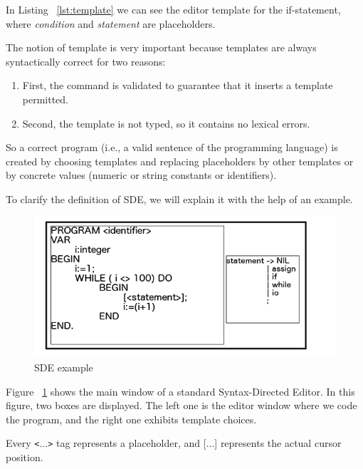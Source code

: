 \documentclass[
  oneside,
  11pt, a4paper,
  footinclude=true,
  headinclude=true,
  cleardoublepage=empty
]{scrbook}
\begin{document}
In Listing ~\ref{lst:template} we can see the editor template for the if-statement, where \textit{condition} and \textit{statement} are placeholders.

The notion of template is very important because templates are always syntactically correct for two reasons:

\begin{enumerate}
  \item First, the command is validated to guarantee that it inserts a template permitted. %

  \item Second, the template is not typed, so it contains no lexical errors.

\end{enumerate}

So a correct program (i.e., a valid sentence of the programming language) is created by choosing templates and replacing placeholders by other templates or by concrete values (numeric or string constants or identifiers).


To clarify the definition of SDE, we will explain it with the help of an example.

\begin{figure}[h!]
  \centering
    \includegraphics[width=1\textwidth]{img/SDE.png}
    \caption{SDE example}
    \label{fig:SDE}
\end{figure}


Figure ~\ref{fig:SDE} shows the main window of a standard Syntax-Directed Editor.
In this figure, two boxes are displayed.
The left one is the editor window where we code the program, and the right one exhibits template choices.

Every \texttt{<}...\texttt{>}  tag represents a placeholder, and [...] represents the actual cursor position.
\end{document}
